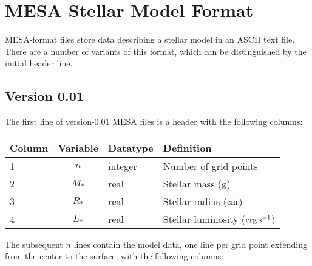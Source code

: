 \documentclass{article}
\newcommand{\Rstar}{\ensuremath{R_{\ast}}}
\newcommand{\Mstar}{\ensuremath{M_{\ast}}}
\newcommand{\Lstar}{\ensuremath{L_{\ast}}}
\newcommand{\cm}{\ensuremath{{\rm cm}}}
\newcommand{\gram}{\ensuremath{{\rm g}}}
\newcommand{\second}{\ensuremath{{\rm s}}}
\newcommand{\erg}{\ensuremath{{\rm erg}}}
\begin{document}
\section*{MESA Stellar Model Format}

MESA-format files store data describing a stellar model in an ASCII
text file. There are a number of variants of this format, which can be
distinguished by the initial header line.

\subsection*{Version 0.01}

The first line of version-0.01 MESA files is a header with the following
columns:

\begin{table}[h!]
\begin{tabular}{|l|c|l|l|} \hline
Column & Variable & Datatype & Definition \\ \hline
1      & $n$ & integer & Number of grid points \\
2      & \Mstar & real & Stellar mass ($\gram$) \\
3      & \Rstar & real & Stellar radius ($\cm$) \\
4      & \Lstar & real & Stellar luminosity ($\erg\,\second^{-1}$) \\ \hline
\end{tabular}
\end{table}

The subsequent $n$ lines contain the model data, one line per
grid point extending from the center to the surface, with the following columns:
\end{document}
